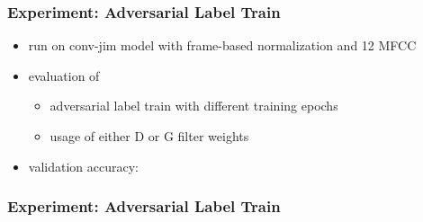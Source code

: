 \begin{frame}
  \frametitle{Experiment: Adversarial Label Train}
  \begin{itemize}
    \item run on conv-jim model with frame-based normalization and 12 MFCC
    \item evaluation of
    \begin{itemize}
     \item adversarial label train with different training epochs
     \item usage of either D or G filter weights
    \end{itemize}
    \item validation accuracy:
    \vspace{-0.5cm}
    \begin{figure}[!ht]
    \centering
    \end{figure}
  \end{itemize}
\end{frame}

\begin{frame}
  \frametitle{Experiment: Adversarial Label Train}
  
\end{frame}

